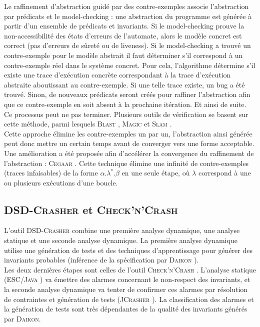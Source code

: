 Le raffinement d'abstraction guidé par des contre-exemples \cite{CEGAR} associe
l’abstraction par prédicats et le model-checking : une abstraction du programme
est générée à partir d’un ensemble de prédicats et invariants. Si le
model-checking prouve la non-accessibilité des états d'erreurs de l'automate,
alors le modèle concret est correct (pas d'erreurs de sûreté ou de liveness).
Si le model-checking a trouvé un contre-exemple pour le modèle abstrait il faut
déterminer s'il correspond à un contre-exemple réel dans le système concret.
Pour cela, l'algorithme détermine s'il existe une trace d'exécution concrète
correspondant à la trace d'exécution abstraite aboutissant au contre-exemple.
Si une telle trace existe, un bug a été trouvé. Sinon, de nouveaux prédicats
seront créés pour raffiner l'abstraction afin que ce contre-exemple en soit
absent à la prochaine itération. Et ainsi de suite. Ce processus peut ne pas
terminer. Plusieurs outils de vérification se basent sur cette méthode, parmi
lesquels \textsc{Blast} \cite{BLAST}, \textsc{Magic} \cite{MAGIC} et
\textsc{Slam} \cite{SLAM}.\\

Cette approche élimine les contre-exemples un par un, l'abstraction ainsi
générée peut donc mettre un certain temps avant de converger vers une forme
acceptable. Une amélioration a été proposée afin d'accélérer la convergence du
raffinement de l'abstraction : \textsc{Cegaar} \cite{CEGAAR}. Cette technique
élimine une infinité de contre-exemples (traces infaisables) de la forme
$\alpha . \lambda^* . \beta$ en une seule étape, où $\lambda$ correspond à une
ou plusieurs exécutions d'une boucle.

\subsection{\textsc{DSD-Crasher} et \textsc{Check'n'Crash}}

L'outil \textsc{DSD-Crasher} \cite{DSD-Crasher} combine une première analyse
dynamique, une analyse statique et une seconde analyse dynamique. La première
analyse dynamique utilise une génération de tests et des techniques
d'apprentissage pour générer des invariants probables (inférence de la
spécification par \textsc{Daikon} \cite{discover-invariants}).\\

Les deux dernières étapes sont celles de l'outil \textsc{Check'n'Crash}
\cite{ChecknCrash}. L'analyse statique (\textsc{ESC/Java} \cite{ESC/Java}) va
émettre des alarmes concernant le non-respect des invariants, et la seconde
analyse dynamique va tenter de confirmer ces alarmes par résolution de
contraintes et génération de tests (\textsc{JCrasher} \cite{JCrasher}). La
classification des alarmes et la génération de tests sont très dépendantes de
la qualité des invariants générés par \textsc{Daikon}.\\

